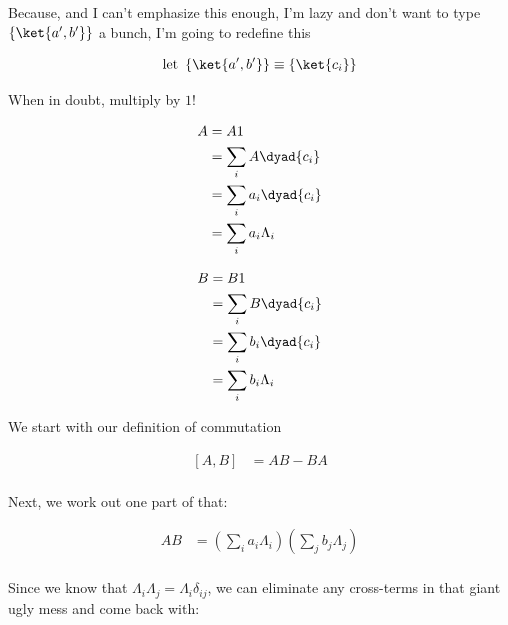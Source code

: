 \begin{answer}
  
  Because, and I can't emphasize this enough, I'm lazy and don't want
  to type $\left\{\ket{a',b'}\right\}$ a bunch, I'm going to redefine
  this

  \begin{equation}
    \text{let }\left\{\ket{a',b'}\right\} \equiv \left\{\ket{c_i}\right\}
  \end{equation}
  
  When in doubt, multiply by $1$!

  \begin{equation}
    \begin{split}
      A &= A1\\
      &= \sum_{i}A\dyad{c_i}\\
      &= \sum_{i}a_i\dyad{c_i}\\
      &= \sum_{i}a_i\Lambda_i\\
    \end{split}
  \end{equation}

  \begin{equation}
    \begin{split}
      B &= B1\\
      &= \sum_{i}B\dyad{c_i}\\
      &= \sum_{i}b_i\dyad{c_i}\\
      &= \sum_{i}b_i\Lambda_i\\
    \end{split}
  \end{equation}

  We start with our definition of commutation

  \begin{equation}
    \begin{split}
      [A, B] &= AB - BA\\
    \end{split}
  \end{equation}

  Next, we work out one part of that:

  \begin{equation}
    \begin{split}
      AB
      &= \left(\sum_{i} a_i\Lambda_i\right)\left(\sum_{j} b_j\Lambda_j\right)\\
    \end{split}
  \end{equation}

  Since we know that $\Lambda_i\Lambda_j = \Lambda_i\delta_{ij}$, we can
  eliminate any cross-terms in that giant ugly mess and come back with:
  

\end{answer}
